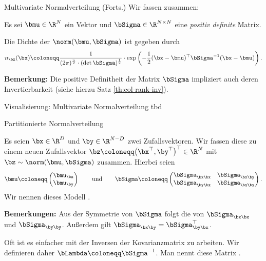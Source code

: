\begin{frame}{Multivariate Normalverteilung (Forts.)}{}
	Wir fassen zusammen:
	
	\begin{mydef}
		Es sei $\bmu \in \R^N$ ein Vektor und $\bSigma \in \R^{N \times N}$ eine \textit{positiv definite} Matrix.
		
		Die Dichte der  $\norm(\bmu, \bSigma)$ ist gegeben durch
		\begin{equation*}
			n_{\bx}(\bx) \coloneqq \frac{1}{(2 \pi)^{\frac{n}{2}} \cdot (\det \bSigma)^{\frac{1}{2}}} \cdot \exp\left(
				-\frac{1}{2} (\bx - \bmu)^\top \bSigma^{-1} (\bx - \bmu)
			\right).
		\end{equation*}
	\end{mydef}
	
	\begin{boxGray}
		\textbf{Bemerkung:} Die positive Definitheit der Matrix $\bSigma$ impliziert auch deren Invertierbarkeit
		(siehe hierzu Satz \ref{th:col-rank-inv}).
	\end{boxGray}
\end{frame}


\begin{frame}{Visualisierung: Multivariate Normalverteilung}{}
	tbd
\end{frame}


\begin{frame}{Partitionierte Normalverteilung}{}
	\begin{mydef}
		Es seien $\bx \in \R^D$ und $\by \in \R^{N - D}$ zwei Zufallsvektoren.
		Wir fassen diese zu einem neuen Zufallsvektor $\bz \coloneqq \bigl( \bx^\top, \by^\top \bigr)^\top \in \R^N$
		mit $\bz \sim \norm(\bmu, \bSigma)$ zusammen. Hierbei seien
		\begin{equation*}
			\bmu
				\coloneqq \begin{pmatrix} \bmu_{\bx} \\ \bmu_{\by} \end{pmatrix}
		\qquad\text{und}\qquad
			\bSigma
				\coloneqq \begin{pmatrix}
					\bSigma_{\bx\bx} & \bSigma_{\bx\by} \\
					\bSigma_{\by\bx} & \bSigma_{\by\by}
				\end{pmatrix}.
		\end{equation*}
		Wir nennen dieses Modell .
	\end{mydef}
	
	\begin{boxGray}
		\textbf{Bemerkungen:} Aus der Symmetrie von $\bSigma$ folgt die von $\bSigma_{\bx\bx}$ und $\bSigma_{\by\by}$.
		Außerdem gilt $\bSigma_{\bx\by} = \bSigma_{\by\bx}^\top$.
		
		Oft ist es einfacher mit der Inversen der Kovarianzmatrix zu arbeiten. Wir definieren daher
		$\bLambda \coloneqq \bSigma^{-1}$. Man nennt diese Matrix .
	\end{boxGray}
\end{frame}


